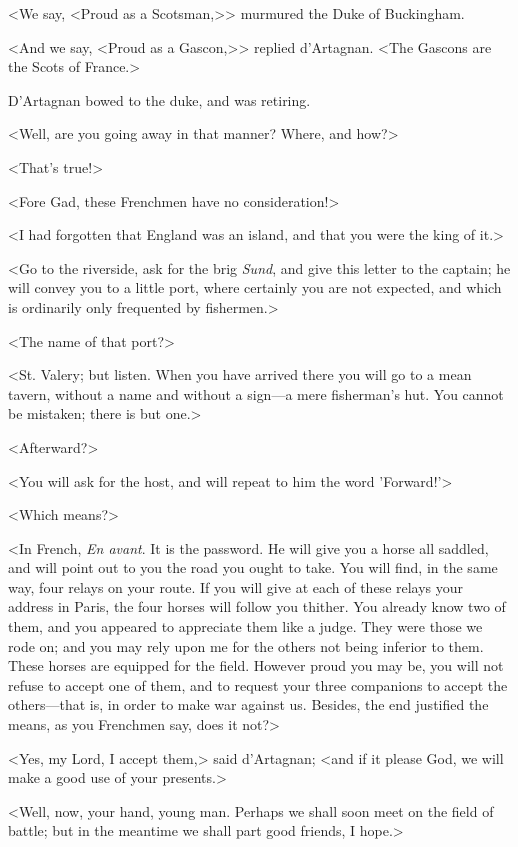 <We say, <Proud as a Scotsman,>> murmured the Duke of Buckingham. 

<And we say, <Proud as a Gascon,>> replied d'Artagnan. <The Gascons are the Scots of France.> 

D'Artagnan bowed to the duke, and was retiring. 

<Well, are you going away in that manner? Where, and how?> 

<That's true!> 

<Fore Gad, these Frenchmen have no consideration!> 

<I had forgotten that England was an island, and that you were the king of it.> 

<Go to the riverside, ask for the brig \textit{Sund}, and give this letter to the captain; he will convey you to a little port, where certainly you are not expected, and which is ordinarily only frequented by fishermen.> 

<The name of that port?> 

<St. Valery; but listen. When you have arrived there you will go to a mean tavern, without a name and without a sign---a mere fisherman's hut. You cannot be mistaken; there is but one.> 

<Afterward?> 

<You will ask for the host, and will repeat to him the word 'Forward!'> 

<Which means?> 

<In French, \textit{En avant}. It is the password. He will give you a horse all saddled, and will point out to you the road you ought to take. You will find, in the same way, four relays on your route. If you will give at each of these relays your address in Paris, the four horses will follow you thither. You already know two of them, and you appeared to appreciate them like a judge. They were those we rode on; and you may rely upon me for the others not being inferior to them. These horses are equipped for the field. However proud you may be, you will not refuse to accept one of them, and to request your three companions to accept the others---that is, in order to make war against us. Besides, the end justified the means, as you Frenchmen say, does it not?> 

<Yes, my Lord, I accept them,> said d'Artagnan; <and if it please God, we will make a good use of your presents.> 

<Well, now, your hand, young man. Perhaps we shall soon meet on the field of battle; but in the meantime we shall part good friends, I hope.> 

